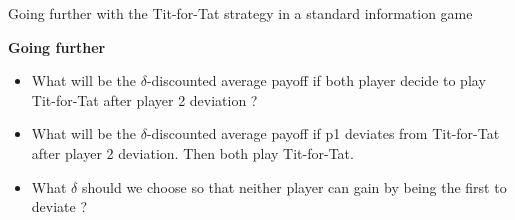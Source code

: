 \begin{frame}{Going further with the Tit-for-Tat strategy in a standard information game}
	
	\textbf{Going further}
	\begin{itemize}
	\item What will be the $\delta$-discounted average payoff if both player decide to play Tit-for-Tat after player 2 deviation ?
	\pause
	
	\item What will be the $\delta$-discounted average payoff if p1 deviates from Tit-for-Tat after player 2 deviation. Then both play Tit-for-Tat.
	\pause
	\item What $\delta$ should we choose so that neither player can gain by being the first to deviate ?
	\end{itemize}
\end{frame}

